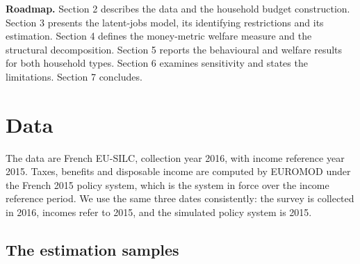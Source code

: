 \documentclass[11pt,a4paper]{article}
\begin{document}
\textbf{Roadmap.} Section 2 describes the data and the household budget construction. Section 3 presents the latent-jobs model, its identifying restrictions and its estimation. Section 4 defines the money-metric welfare measure and the structural decomposition. Section 5 reports the behavioural and welfare results for both household types. Section 6 examines sensitivity and states the limitations. Section 7 concludes.

\section{Data}\label{data}

The data are French EU-SILC, collection year 2016, with income reference year 2015. Taxes, benefits and disposable income are computed by EUROMOD \citep{sutherlandfigari2013} under the French 2015 policy system, which is the system in force over the income reference period. We use the same three dates consistently: the survey is collected in 2016, incomes refer to 2015, and the simulated policy system is 2015.

\subsection{The estimation samples}\label{the-estimation-samples}
\end{document}

